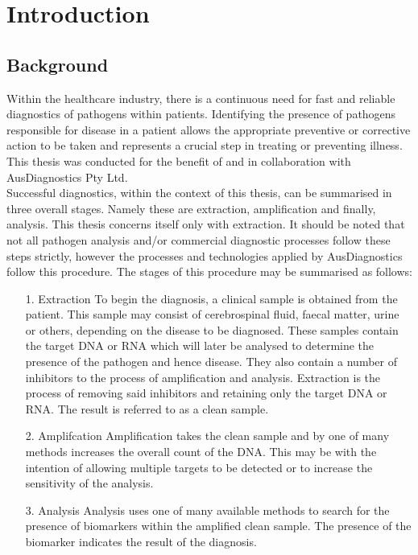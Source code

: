 \chapter{Introduction}
\label{cha:introduction}

\section{Background}
\label{sec:intro_background}

Within the healthcare industry, there is a continuous need for fast and reliable diagnostics of pathogens within patients. Identifying the presence of pathogens responsible for disease in a patient allows the appropriate preventive or corrective action to be taken and represents a crucial step in treating or preventing illness. This thesis was conducted for the benefit of and in collaboration with AusDiagnostics Pty Ltd.\\

Successful diagnostics, within the context of this thesis, can be summarised in three overall stages. Namely these are extraction, amplification and finally, analysis. This thesis concerns itself only with extraction. It should be noted that not all pathogen analysis and/or commercial diagnostic processes follow these steps strictly, however the processes and technologies applied by AusDiagnostics follow this procedure. The stages of this procedure may be summarised as follows:
\begin{enumerate}
	\item [1. Extraction] To begin the diagnosis, a clinical sample is obtained from the patient. This sample may consist of cerebrospinal fluid, faecal matter, urine or others, depending on the disease to be diagnosed. These samples contain the target DNA or RNA which will later be analysed to determine the presence of the pathogen and hence disease. They also contain a number of inhibitors to the process of amplification and analysis. Extraction is the process of removing said inhibitors and retaining only the target DNA or RNA. The result is referred to as a clean sample.
	\item  [2. Amplifcation] Amplification takes the clean sample and by one of many methods increases the overall count of the DNA. This may be with the intention of allowing multiple targets to be detected or to increase the sensitivity of the analysis.
	\item[3. Analysis] Analysis uses one of many available methods to search for the presence of biomarkers within the amplified clean sample. The presence of the biomarker indicates the result of the diagnosis.
\end{enumerate}


